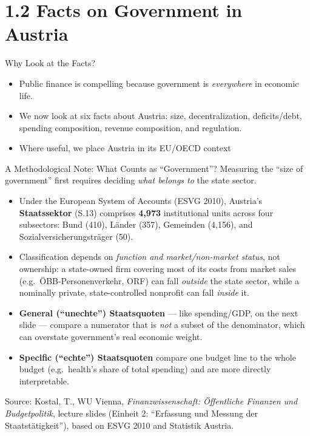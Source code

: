 \documentclass[11pt,aspectratio=169]{beamer}
\newcommand{\srcnote}[1]{{\footnotesize\color{wugray}Source: #1}}
\begin{document}
\section{1.2 Facts on Government in Austria}

\begin{frame}{Why Look at the Facts?}
  \begin{itemize}
    \item Public finance is compelling because government is \emph{everywhere} in economic life.
    \item We now look at six facts about Austria: size, decentralization, deficits/debt, spending composition, revenue composition, and regulation.
    \item Where useful, we place Austria in its EU/OECD context

  \end{itemize}
\end{frame}

\begin{frame}{A Methodological Note: What Counts as ``Government''?}
  \footnotesize
  Measuring the ``size of government'' first requires deciding \emph{what belongs to} the state sector.
  \begin{itemize}
    \item Under the European System of Accounts (ESVG 2010), Austria's \textbf{Staatssektor} (S.13) comprises \textbf{4{,}973} institutional units across four subsectors: Bund (410), Länder (357), Gemeinden (4{,}156), and Sozialversicherungsträger (50).
    \item Classification depends on \emph{function and market/non-market status}, not ownership: a state-owned firm covering most of its costs from market sales (e.g.\ ÖBB-Personenverkehr, ORF) can fall \emph{outside} the state sector, while a nominally private, state-controlled nonprofit can fall \emph{inside} it.
    \item \textbf{General (``unechte'') Staatsquoten} --- like spending/GDP, on the next slide --- compare a numerator that is \emph{not} a subset of the denominator, which can overstate government's real economic weight.
    \item \textbf{Specific (``echte'') Staatsquoten} compare one budget line to the whole budget (e.g.\ health's share of total spending) and are more directly interpretable.
  \end{itemize}
  \srcnote{Kostal, T., WU Vienna, \emph{Finanzwissenschaft: Öffentliche Finanzen und Budgetpolitik}, lecture slides (Einheit 2: ``Erfassung und Messung der Staatstätigkeit''), based on ESVG 2010 and Statistik Austria.}
\end{frame}
\end{document}
